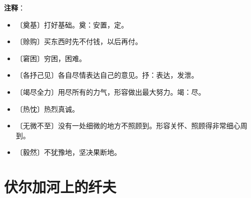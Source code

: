 \documentclass[12pt,UTF-8,openany]{ctexbook}
\begin{document}
\newpage

\textbf{注释}：

\vspace{-1em}

\begin{itemize}
    \setlength\itemsep{-0.2em}
    \item 〔奠基〕打好基础。奠：安置，定。
    \item 〔赊购〕买东西时先不付钱，以后再付。
    \item 〔窘困〕穷困，困难。
    \item 〔各抒己见〕各自尽情表达自己的意见。抒：表达，发泄。
    \item 〔竭尽全力〕用尽所有的力气，形容做出最大努力。竭：尽。
    \item 〔热忱〕热烈真诚。
    \item 〔无微不至〕没有一处细微的地方不照顾到。形容关怀、照顾得非常细心周到。
    \item 〔毅然〕不犹豫地，坚决果断地。
\end{itemize}

\chapter{伏尔加河上的纤夫}
\end{document}
